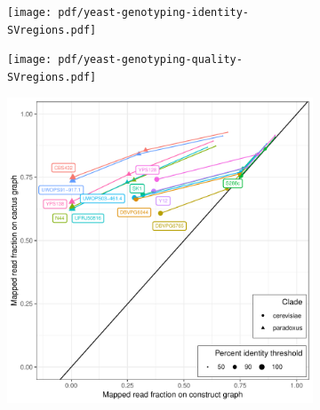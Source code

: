 \documentclass{article}
\begin{document}
\clearpage
\begin{figure}
  \begin{subfigure}[b]{.5\textwidth}
    \caption{}
    \texttt{[image: pdf/yeast-genotyping-identity-SVregions.pdf]}
  \end{subfigure}
  \begin{subfigure}[b]{.5\textwidth}
    \caption{}
    \texttt{[image: pdf/yeast-genotyping-quality-SVregions.pdf]}
  \end{subfigure}
\end{figure}

\clearpage
\begin{figure}
  \begin{subfigure}[b]{.5\textwidth}
    \caption{}
    \includegraphics[width=\textwidth]{pdf/yeast-mapping-identity-all.pdf}
  \end{subfigure}
  \begin{subfigure}[b]{.5\textwidth}
    \caption{}

\end{subfigure}
\end{figure}
\end{document}
